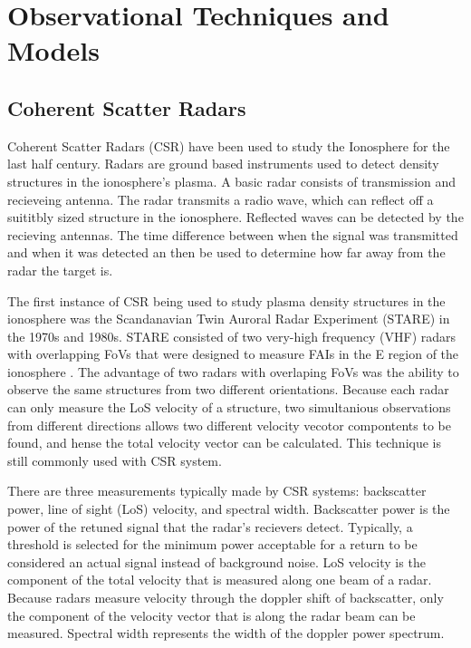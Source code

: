 \section{Observational Techniques and Models}


\subsection{Coherent Scatter Radars}

Coherent Scatter Radars (CSR) have been used to study the Ionosphere for the last half century.  Radars are ground based instruments used to detect density structures in the ionosphere's plasma.  A basic radar consists of transmission and recieveing antenna.  The radar transmits a radio wave, which can reflect off a suititbly sized structure in the ionosphere.  Reflected waves can be detected by the recieving antennas.  The time difference between when the signal was transmitted and when it was detected  an then be used to determine how far away from the radar the target is.

The first instance of CSR being used to study plasma density structures in the ionosphere was the Scandanavian Twin Auroral Radar Experiment (STARE) in the 1970s and 1980s.  STARE consisted of two very-high frequency (VHF) radars with overlapping FoVs that were designed to measure FAIs in the E region of the ionosphere \citep{Greenwald1997}.  The advantage of two radars with overlaping FoVs was the ability to observe the same structures from two different orientations.  Because each radar can only measure the LoS velocity of a structure, two simultanious observations from different directions allows two different velocity vecotor compontents to be found, and hense the total velocity vector can be calculated.  This technique is still commonly used with CSR system.

There are three measurements typically made by CSR systems: backscatter power, line of sight (LoS) velocity, and spectral width.  Backscatter power is the power of the retuned signal that the radar's recievers detect.  Typically, a threshold is selected for the minimum power acceptable for a return to be considered an actual signal instead of background noise.  LoS velocity is the component of the total velocity that is measured along one beam of a radar.  Because radars measure velocity through the doppler shift of backscatter, only the component of the velocity vector that is along the radar beam can be measured.  Spectral width represents the width of the doppler power spectrum.

